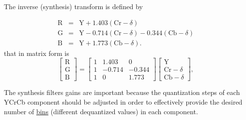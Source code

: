 The inverse (synthesis) transform is defined by
\begin{comment}
\begin{equation}
  \begin{bmatrix}
    \text{R} \\
    \text{G} \\
    \text{B}
  \end{bmatrix}
  =
  \begin{bmatrix}
    1  &  1.402  & 0 \\ 
    1  &  -0.714  &  -0.344 \\ 
    1  & 0  & 1.772
  \end{bmatrix}
  \begin{bmatrix}
    \text{Y} \\
    \text{Cr} \\
    \text{Cb}
  \end{bmatrix},
\end{equation}
or alternatively, by
\end{comment}
\begin{equation}
  \begin{array}{lcl}
    \text{R} & = & \text{Y} + 1.403(\text{Cr} - \delta) \\
    \text{G} & = & \text{Y} - 0.714(\text{Cr} - \delta) - 0.344(\text{Cb} - \delta)\\
    \text{B} & = & \text{Y} + 1.773(\text{Cb} - \delta).
  \end{array}
  \label{eq:iYCrCb}
\end{equation}
that in matrix form is
\begin{equation}
  \begin{bmatrix}
    \text{R} \\
    \text{G} \\
    \text{B}
  \end{bmatrix}
  =
  \begin{bmatrix}
    1  &  1.403  & 0 \\ 
    1  &  -0.714  &  -0.344 \\ 
    1  & 0  & 1.773
  \end{bmatrix}
  \begin{bmatrix}
    \text{Y} \\
    \text{Cr}-\delta \\
    \text{Cb}-\delta
  \end{bmatrix},
\end{equation}

The synthesis filters gains are important because the quantization steps of each YCrCb component should be adjusted in order to effectively provide the desired number of \href{http://www.winlab.rutgers.edu/~crose/322_html/quantization.pdf}{bins} (different dequantized values) in each component.

